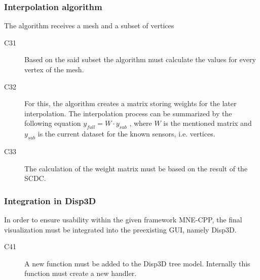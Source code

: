 \subsubsection{Interpolation algorithm}
The algorithm receives a mesh and a subset of vertices %
\begin{description}
	\item[C31] Based on the said subset the algorithm must calculate the values for every vertex of the mesh.
	
	\item[C32] For this, the algorithm creates a matrix storing weights for the later interpolation.
	The interpolation process can be summarized by the following equation $y_{full} = W \cdot y_{sub}$
	, where $W$ is the mentioned matrix and $y_{sub}$ is the current dataset for the known sensors, i.e. vertices.
	
	\item[C33] The calculation of the weight matrix must be based on the result of the SCDC.
	
\end{description}

\subsubsection{Integration in Disp3D}
	In order to ensure usability within the given framework MNE-CPP, the final visualization must be integrated into the preexisting GUI, namely Disp3D.
	
	\begin{description}
		\item[C41] A new function must be added to the Disp3D tree model. Internally this function must create a new handler.%
	\end{description}



	
